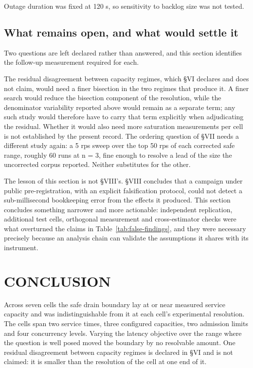\documentclass{ieeeaccess}
\begin{document}
Outage duration was fixed at 120 s, so sensitivity to backlog size was not tested.

\subsection{What remains open, and what would settle it}

Two questions are left declared rather than answered, and this section identifies the follow-up measurement required for each.

The residual disagreement between capacity regimes, which \S{}VI declares and does not claim, would need a finer bisection in the two regimes that produce it. A finer search would reduce the bisection component of the resolution, while the denominator variability reported above would remain as a separate term; any such study would therefore have to carry that term explicitly when adjudicating the residual. Whether it would also need more saturation measurements per cell is not established by the present record. The ordering question of \S{}VII needs a different study again: a 5 rps sweep over the top 50 rps of each corrected safe range, roughly 60 runs at n = 3, fine enough to resolve a lead of the size the uncorrected corpus reported. Neither substitutes for the other.

The lesson of this section is not \S{}VIII's. \S{}VIII concludes that a campaign under public pre-registration, with an explicit falsification protocol, could not detect a sub-millisecond bookkeeping error from the effects it produced. This section concludes something narrower and more actionable: independent replication, additional test cells, orthogonal measurement and cross-estimator checks were what overturned the claims in Table~\ref{tab:false-findings}, and they were necessary precisely because an analysis chain can validate the assumptions it shares with its instrument.

\section{CONCLUSION}

Across seven cells the safe drain boundary lay at or near measured service capacity and was indistinguishable from it at each cell's experimental resolution. The cells span two service times, three configured capacities, two admission limits and four concurrency levels. Varying the latency objective over the range where the question is well posed moved the boundary by no resolvable amount. One residual disagreement between capacity regimes is declared in \S{}VI and is not claimed: it is smaller than the resolution of the cell at one end of it.
\end{document}
